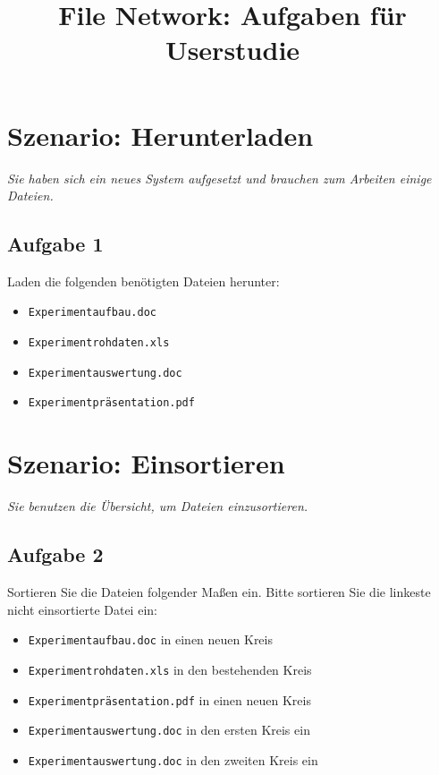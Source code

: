 \documentclass[12pt,]{article}
\title{File Network: Aufgaben für Userstudie}
\author{}
\date{}
\begin{document}
\maketitle

\newpage

\section{Szenario: Herunterladen}

\emph{Sie haben sich ein neues System aufgesetzt und brauchen zum
Arbeiten einige Dateien.}

\subsection{Aufgabe 1}

Laden die folgenden benötigten Dateien herunter:

\begin{itemize}
\item
  \texttt{Experimentaufbau.doc}
\item
  \texttt{Experimentrohdaten.xls}
\item
  \texttt{Experimentauswertung.doc}
\item
  \texttt{Experimentpräsentation.pdf}
\end{itemize}

\newpage

\section{Szenario: Einsortieren}

\emph{Sie benutzen die Übersicht, um Dateien einzusortieren.}

\subsection{Aufgabe 2}

Sortieren Sie die Dateien folgender Maßen ein. Bitte sortieren Sie die
linkeste nicht einsortierte Datei ein:

\begin{itemize}
\item
  \texttt{Experimentaufbau.doc} in einen neuen Kreis
\item
  \texttt{Experimentrohdaten.xls} in den bestehenden Kreis
\item
  \texttt{Experimentpräsentation.pdf} in einen neuen Kreis
\item
  \texttt{Experimentauswertung.doc} in den ersten Kreis ein
\item
  \texttt{Experimentauswertung.doc} in den zweiten Kreis ein
\end{itemize}
\end{document}
